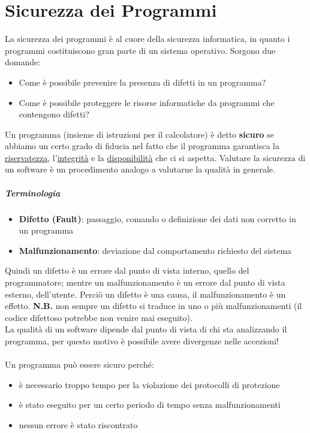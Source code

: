 \chapter{Sicurezza dei Programmi}
La sicurezza dei programmi è al cuore della sicurezza informatica, in quanto i programmi costituiscono gran parte di un sistema operativo. Sorgono due domande:
\begin{itemize}
\item Come è possibile prevenire la presenza di difetti in un programma?
\item Come è possibile proteggere le risorse informatiche da programmi che contengono difetti?
\end{itemize}

Un programma (insieme di istruzioni per il calcolatore) è detto \textbf{sicuro} se abbiamo un certo grado di fiducia nel fatto che il programma garantisca la \underline{riservatezza}, l'\underline{integrità} e la \underline{disponibilità} che ci si aspetta.
Valutare la sicurezza di un software è un procedimento analogo a valutarne la qualità in generale.
\paragraph{Terminologia}
\begin{itemize}
\item \textbf{Difetto (Fault)}: passaggio, comando o definizione dei dati non corretto in un programma
\item \textbf{Malfunzionamento}: deviazione dal comportamento richiesto del sistema
\end{itemize}

Quindi un difetto è un errore dal punto di vista interno, quello del programmatore; mentre un malfunzionamento è un errore dal punto di vista esterno, dell'utente. Perciò un difetto è una causa, il malfunzionamento è un effetto. \textbf{N.B.} non sempre un difetto si traduce in uno o più malfunzionamenti (il codice difettoso potrebbe non venire mai eseguito). \\
La qualità di un software dipende dal punto di vista di chi sta analizzando il programma, per questo motivo è possibile avere divergenze nelle accezioni! \\ \\
Un programma può essere sicuro perché:

\begin{itemize}
\item è necessario troppo tempo per la violazione dei protocolli di protezione
\item è stato eseguito per un certo periodo di tempo senza malfunzionamenti 
\item nessun errore è stato riscontrato
\end{itemize}


